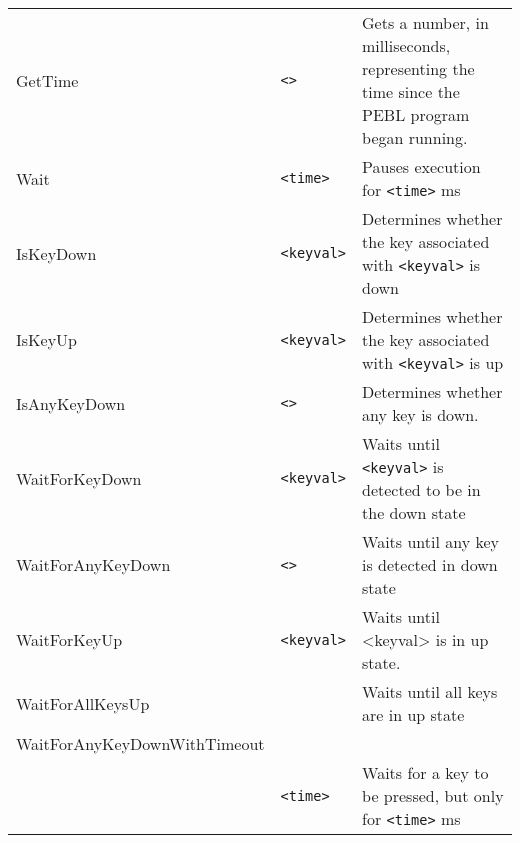 \begin{longtable}{p{3cm}p{3cm}p{6cm}}
GetTime        &\verb+<>+           &Gets a number, in milliseconds, representing the time since the PEBL program began running.\\
Wait           &\verb+<time>+       &Pauses execution for \verb+<time>+ ms \\   
IsKeyDown      &\verb+<keyval>+     &Determines whether the key associated with \verb+<keyval>+ is down \\
IsKeyUp        &\verb+<keyval>+     &Determines whether the key associated with \verb+<keyval>+ is up\\
IsAnyKeyDown   &\verb+<>+           &Determines whether any key is down.\\
WaitForKeyDown & \verb+<keyval>+     &Waits until \verb+<keyval>+ is detected to be in the down state\\
WaitForAnyKeyDown &\hspace{0.5cm} \verb+<>+       &Waits until any key is detected in down state\\
 WaitForKeyUp      &\verb+<keyval>+ &Waits until <keyval> is in up state.\\
 WaitForAllKeysUp  &           	    &Waits until all keys are in up state\\
 WaitForAnyKeyDownWithTimeout&  & \\
 & \verb+<time>+ & Waits for a key to be pressed, but only for \verb+<time>+ ms\\


\end{longtable}
